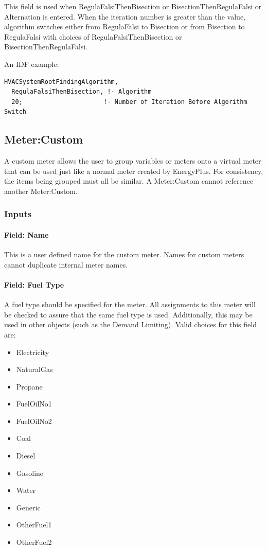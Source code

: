 This field is used when RegulaFalsiThenBisection or BisectionThenRegulaFalsi or Alternation is entered. When the iteration number is greater than the value, algorithm switches either from RegulaFalsi to Bisection or from Bisection to RegulaFalsi with choices of RegulaFalsiThenBisection or BisectionThenRegulaFalsi.

An IDF example:

\begin{lstlisting}
HVACSystemRootFindingAlgorithm,
  RegulaFalsiThenBisection, !- Algorithm
  20;                      !- Number of Iteration Before Algorithm Switch
\end{lstlisting}

\subsection{Meter:Custom}\label{metercustom}

A custom meter allows the user to group variables or meters onto a virtual meter that can be used just like a normal meter created by EnergyPlus. For consistency, the items being grouped must all be similar. A Meter:Custom cannot reference another Meter:Custom.

\subsubsection{Inputs}\label{inputs-17-008}

\paragraph{Field: Name}\label{field-name-043}

This is a user defined name for the custom meter. Names for custom meters cannot duplicate internal meter names.

\paragraph{Field: Fuel Type}\label{field-fuel-type-004}

A fuel type should be specified for the meter. All assignments to this meter will be checked to assure that the same fuel type is used. Additionally, this may be used in other objects (such as the Demand Limiting). Valid choices for this field are:

\begin{itemize}
\item
  Electricity
\item
  NaturalGas
\item
  Propane
\item
  FuelOilNo1
\item
  FuelOilNo2
\item
  Coal
\item
  Diesel
\item
  Gasoline
\item
  Water
\item
  Generic
\item
  OtherFuel1
\item
  OtherFuel2
\end{itemize}

